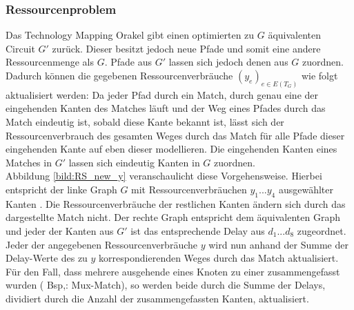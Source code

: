 \documentclass[11pt, a4paper, german]{article}
\newcommand{\TM}{Technology  Mapping }
\begin{document}
\subsubsection{Ressourcenproblem}
Das \TM Orakel  gibt einen optimierten zu $G$ äquivalenten Circuit $G'$ zurück. Dieser besitzt jedoch neue Pfade und somit eine andere Ressourcenmenge als $G$. 
Pfade aus $G'$ lassen sich jedoch denen aus $G$ zuordnen. Dadurch können die gegebenen Ressourcenverbräuche $(y_e)_{e \in E(T_G)}$ wie folgt aktualisiert werden:
Da jeder Pfad durch ein Match, durch genau eine der eingehenden Kanten des Matches läuft und der Weg eines Pfades durch das Match eindeutig ist, sobald diese Kante bekannt ist, lässt sich der Ressourcenverbrauch des gesamten Weges durch das Match für alle Pfade dieser eingehenden Kante auf eben dieser modellieren. Die eingehenden Kanten eines Matches in $G'$ lassen sich eindeutig Kanten in $G$ zuordnen. \\

Abbildung \ref{bild:RS_new_y} veranschaulicht diese Vorgehensweise. Hierbei entspricht der linke Graph $G$ mit Ressourcenverbräuchen $y_1 ... y_4$ ausgewählter Kanten . Die Ressourcenverbräuche der restlichen Kanten ändern sich durch das dargestellte Match nicht. Der rechte Graph entspricht dem äquivalenten Graph und jeder der Kanten aus $G'$ ist das entsprechende Delay aus $d_1... d_8$ zugeordnet.\\
Jeder der angegebenen Ressourcenverbräuche $y$ wird nun anhand der Summe der Delay-Werte des zu  $y$ korrespondierenden Weges durch das Match aktualisiert. 
Für den Fall, dass mehrere ausgehende eines Knoten zu einer zusammengefasst wurden ( Bsp,: Mux-Match), so werden beide durch die Summe der Delays, dividiert durch die Anzahl der zusammengefassten Kanten, aktualisiert.
\end{document}
